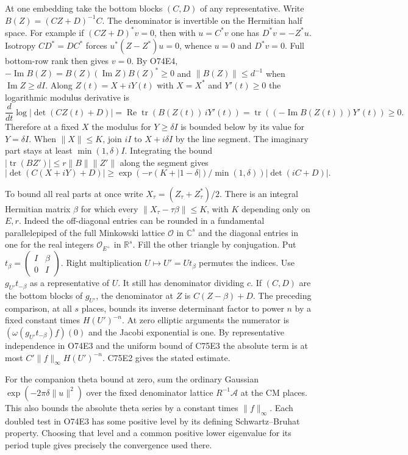 At one embedding take the bottom blocks $(C,D)$ of any representative.
Write $B(Z)=(CZ+D)^{-1}C$. The denominator is invertible on the
Hermitian half space. For example if $(CZ+D)^*v=0$, then with
$u=C^*v$ one has $D^*v=-Z^*u$. Isotropy $CD^*=DC^*$ forces
$u^*(Z-Z^*)u=0$, whence $u=0$ and $D^*v=0$. Full bottom-row rank
then gives $v=0$. By O74E4, $-\operatorname{Im} B(Z)=
B(Z)(\operatorname{Im} Z)B(Z)^*\ge0$ and $\|B(Z)\|\le d^{-1}$
when $\operatorname{Im} Z\ge dI$. Along $Z(t)=X+iY(t)$ with
$X=X^*$ and $Y'(t)\ge0$ the logarithmic modulus derivative is
\[
 \frac{d}{dt}\log|\det(CZ(t)+D)|
    =\operatorname{Re}\operatorname{tr}(B(Z(t))\,iY'(t))
    =\operatorname{tr}((-\operatorname{Im}B(Z(t)))Y'(t))\ge0 .
\]
Therefore at a fixed $X$ the modulus for $Y\ge\delta I$ is bounded
below by its value for $Y=\delta I$. When $\|X\|\le K$, join $iI$
to $X+i\delta I$ by the line segment. The imaginary part stays at
least $\min(1,\delta)I$. Integrating the bound
$|\operatorname{tr}(B Z')|\le r\|B\|\|Z'\|$ along the segment gives
\[
 |\det(C(X+iY)+D)|\ge \exp\!\left(
   -r(K+|1-\delta|)/\min(1,\delta)\right)|\det(iC+D)|.
\]

To bound all real parts at once write $X_\tau=(Z_\tau+Z_\tau^*)/2$.
There is an integral Hermitian matrix $\beta$ for which every
$\|X_\tau-\tau\beta\|\le K$, with $K$ depending only on $E,r$.
Indeed the off-diagonal entries can be rounded in a fundamental
parallelepiped of the full Minkowski lattice $\mathcal O$ in
$\mathbb C^s$ and the diagonal entries in one for the real integers
$\mathcal O_{E^+}$ in $\mathbb R^s$. Fill the other triangle by
conjugation. Put $t_\beta=\left(\begin{smallmatrix}I&\beta\\0&I\end{smallmatrix}\right)$.
Right multiplication $U\mapsto U'=Ut_\beta$ permutes the indices.
Use $g_{U'}t_{-\beta}$ as a representative of $U$. It still has
denominator dividing $c$. If $(C,D)$ are the bottom blocks of
$g_{U'}$, the denominator at $Z$ is $C(Z-\beta)+D$. The preceding
comparison, at all $s$ places, bounds its inverse determinant factor
to power $n$ by a fixed constant times $H(U')^{-n}$. At zero elliptic
arguments the numerator is $(\omega(g_{U'}t_{-\beta})f)(0)$ and the
Jacobi exponential is one. By representative independence in O74E3
and the uniform bound of C75E3 the absolute term is at most
$C'\|f\|_\infty H(U')^{-n}$. C75E2 gives the stated estimate.

For the companion theta bound at zero, sum the ordinary Gaussian
$\exp(-2\pi\delta\|u\|^2)$ over the fixed denominator lattice
$R^{-1}\mathcal A$ at the CM places. This also bounds the absolute
theta series by a constant times $\|f\|_\infty$. Each doubled test
in O74E3 has some positive level by its defining Schwartz--Bruhat
property. Choosing that level and a common positive lower eigenvalue
for its period tuple gives precisely the convergence used there.
